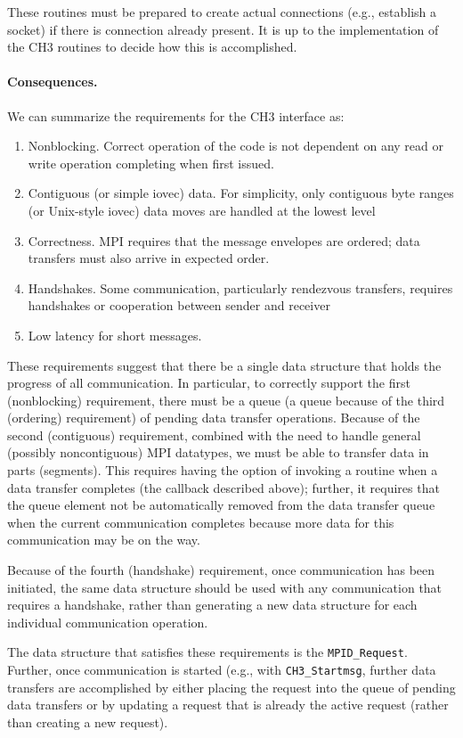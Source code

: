\documentclass{article}
\def\code{\begingroup\makeustext\eatcode}
\def\eatcode#1{\texttt{#1}\endgroup}
\begin{document}
These routines must be prepared to create actual connections (e.g., establish
a socket) if there is connection already present.  It is up to the
implementation of the CH3 routines to decide how this is accomplished.

\paragraph{Consequences.}
We can summarize the requirements for the CH3 interface as:
\begin{enumerate}
\item Nonblocking.  Correct operation of the code is not dependent on any read
  or write operation completing when first issued.  
\item Contiguous (or simple iovec) data.  For simplicity, only contiguous byte
  ranges (or Unix-style iovec) data moves are handled at the lowest level
\item Correctness.  MPI requires that the message envelopes are ordered; data
  transfers must also arrive in expected order.
\item Handshakes.  Some communication, particularly rendezvous transfers,
  requires handshakes or cooperation between sender and receiver
\item Low latency for short messages.
\end{enumerate}
These requirements suggest that there be a single data structure that holds
the progress of all communication. 
In particular, to correctly support the first (nonblocking) requirement, there
must be a queue (a queue because of the third (ordering) requirement) of
pending data transfer operations.  
Because of the second (contiguous) requirement, combined with the need to
handle general (possibly noncontiguous) MPI datatypes, we must be able to
transfer data in parts (segments).  This requires having the option of
invoking a routine when a data transfer completes (the callback described
above); further, it requires that the queue element not be automatically
removed from the data transfer queue when the current communication completes
because more data for this communication may be on the way.

Because of the fourth (handshake) requirement, once communication has been
initiated, the same data structure should be used with any communication that
requires a handshake, rather than generating a new data structure for each
individual communication operation.  

The data structure that satisfies these requirements is the
\code{MPID_Request}.  Further, once communication is started (e.g., with
\code{CH3_Startmsg}, further data transfers are accomplished by either placing
the request into the queue of pending data transfers or by updating a request
that is already the active request (rather than creating a new request).
\end{document}
